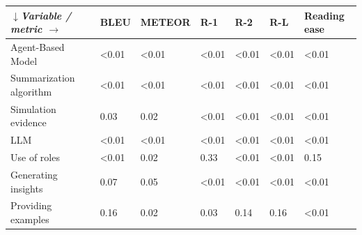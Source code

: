 \begin{tabular}{|l|l|l|l|l|l|l|}
\hline
\textit{$\downarrow$Variable / metric $\rightarrow$} & BLEU & METEOR & R-1 & R-2 & R-L & Reading ease \\
 \hline
 Agent-Based Model & \textless{}0.01 & \textless{}0.01 & \textless{}0.01 & \textless{}0.01 & \textless{}0.01 & \textless{}0.01 \\
 \hline
 Summarization algorithm & \textless{}0.01 & \textless{}0.01 & \textless{}0.01 & \textless{}0.01 & \textless{}0.01 & \textless{}0.01 \\
 \hline
 Simulation evidence & 0.03 & 0.02 & \textless{}0.01 & \textless{}0.01 & \textless{}0.01 & \textless{}0.01 \\
 \hline
 LLM & \textless{}0.01 & \textless{}0.01 & \textless{}0.01 & \textless{}0.01 & \textless{}0.01 & \textless{}0.01 \\
 \hline
 Use of roles & \textless{}0.01 & 0.02 & 0.33 & \textless{}0.01 & \textless{}0.01 & 0.15 \\
 \hline
 Generating insights & 0.07 & 0.05 & \textless{}0.01 & \textless{}0.01 & \textless{}0.01 & \textless{}0.01 \\
 \hline
 Providing examples & 0.16 & 0.02 & 0.03 & 0.14 & 0.16 & \textless{}0.01 \\
\hline
\end{tabular}
